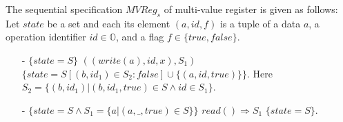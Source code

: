 The sequential specification $\mathit{MVReg}_s$ of multi-value register is given as follows: Let $\mathit{state}$ be a set and each its element $(a,\mathit{id},f)$ is a tuple of a data $a$, a operation identifier $\mathit{id} \in \mathbb{O}$, and a flag $f \in \{ \mathit{true},\mathit{false} \}$.
\begin{itemize}
\setlength{\itemsep}{0.5pt}
\item[-] $\{ \mathit{state} = S \}$ $((write(a),\mathit{id},x),S_1)$ $\{ \mathit{state} = S[(b,\mathit{id}_1) \in S_2 : \mathit{false}]
\cup
\{ (a,id,\mathit{true}) \}
\}$. Here $S_2 = \{ (b,\mathit{id}_1) \vert (b,\mathit{id}_1,\mathit{true}) \in S \wedge id \in S_1 \}$.
\item[-] $\{ \mathit{state} = S \wedge S_1 = \{ a \vert (a,\_,\mathit{true}) \in S \} \}$ $read() \Rightarrow S_1$ $\{ \mathit{state} = S \}$.
\end{itemize}